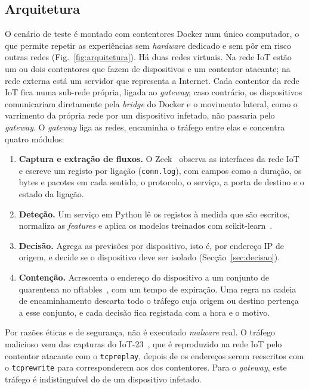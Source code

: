 \documentclass[conference,a4paper]{IEEEtran}
\begin{document}
\subsection{Arquitetura}
O cenário de teste é montado com contentores Docker num único computador, o que permite
repetir as experiências sem \textit{hardware} dedicado e sem pôr em risco outras redes
(Fig.~\ref{fig:arquitetura}). Há duas redes virtuais. Na rede IoT estão um ou dois
contentores que fazem de dispositivos e um contentor atacante; na rede externa está um
servidor que representa a Internet. Cada contentor da rede IoT fica numa sub-rede
própria, ligada ao \textit{gateway}; caso contrário, os dispositivos comunicariam
diretamente pela \textit{bridge} do Docker e o movimento lateral, como o varrimento da
própria rede por um dispositivo infetado, não passaria pelo \textit{gateway}. O
\textit{gateway} liga as redes, encaminha o tráfego entre elas e concentra quatro módulos:
\begin{enumerate}
  \item \textbf{Captura e extração de fluxos.} O Zeek~\cite{paxson1999bro} observa as
  interfaces da rede IoT e escreve um registo por ligação (\texttt{conn.log}), com
  campos como a duração, os bytes e pacotes em cada sentido, o protocolo, o serviço, a
  porta de destino e o estado da ligação.
  \item \textbf{Deteção.} Um serviço em Python lê os registos à medida que são escritos,
  normaliza as \textit{features} e aplica os modelos treinados com
  scikit-learn~\cite{pedregosa2011scikit}.
  \item \textbf{Decisão.} Agrega as previsões por dispositivo, isto é, por endereço IP
  de origem, e decide se o dispositivo deve ser isolado (Secção~\ref{sec:decisao}).
  \item \textbf{Contenção.} Acrescenta o endereço do dispositivo a um conjunto de
  quarentena no nftables~\cite{nftables}, com um tempo de expiração. Uma regra na
  cadeia de encaminhamento descarta todo o tráfego cuja origem ou destino pertença a
  esse conjunto, e cada decisão fica registada com a hora e o motivo.
\end{enumerate}

Por razões éticas e de segurança, não é executado \textit{malware} real. O tráfego
malicioso vem das capturas do IoT-23~\cite{iot23}, que é reproduzido na rede IoT pelo
contentor atacante com o \texttt{tcpreplay}, depois de os endereços serem reescritos
com o \texttt{tcprewrite} para corresponderem aos dos contentores. Para o
\textit{gateway}, este tráfego é indistinguível do de um dispositivo infetado.
\end{document}

